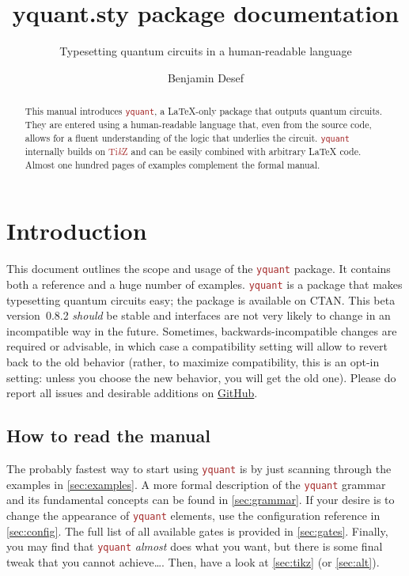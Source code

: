 \documentclass{scrartcl}
\title{yquant.sty package documentation}
\subtitle{Typesetting quantum circuits in a human-readable language}
\author{Benjamin Desef}
\makeatletter
\def\TikZ{\textcolor{brown}{Ti\textit kZ}}
\def\pkg#1{\textcolor{brown}{\texttt{#1}}}
\def\Yquant{\pkg{yquant}}
\newcommand*{\the@orig@section}{}
\let\the@orig@section=\section
\renewcommand*{\section}{%
   \clearpage%
   \the@orig@section%
}
\makeatother
\begin{document}
   \maketitle
   \begin{abstract}
      \noindent This manual introduces \Yquant, a \LaTeX\hyp only package that outputs quantum circuits.
      They are entered using a human\hyp readable language that, even from the source code, allows for a fluent understanding of the logic that underlies the circuit.
      \Yquant{} internally builds on \TikZ{} and can be easily combined with arbitrary \LaTeX{} code.
      Almost one hundred pages of examples complement the formal manual.
   \end{abstract}
   \tableofcontents

   \section{Introduction}
      This document outlines the scope and usage of the \Yquant{} package.
      It contains both a reference and a huge number of examples.
      \Yquant{} is a package that makes typesetting quantum circuits easy; the package is available on CTAN.
      This beta version~0.8.2 \emph{should} be stable and interfaces are not very likely to change in an incompatible way in the future.
      Sometimes, backwards\hyp incompatible changes are required or advisable, in which case a compatibility setting will allow to revert back to the old behavior (rather, to maximize compatibility, this is an opt\hyp in setting: unless you choose the new behavior, you will get the old one).
      Please do report all issues and desirable additions on \href{https://github.com/projekter/yquant/issues}{GitHub}.

      \subsection{How to read the manual}
         The probably fastest way to start using \Yquant{} is by just scanning through the examples in \cref{sec:examples}.
         A more formal description of the \Yquant{} grammar and its fundamental concepts can be found in \cref{sec:grammar}.
         If your desire is to change the appearance of \Yquant{} elements, use the configuration reference in \cref{sec:config}.
         The full list of all available gates is provided in \cref{sec:gates}.
         Finally, you may find that \Yquant{} \emph{almost} does what you want, but there is some final tweak that you cannot achieve\dots.
         Then, have a look at \cref{sec:tikz} (or \cref{sec:alt}).
\end{document}
